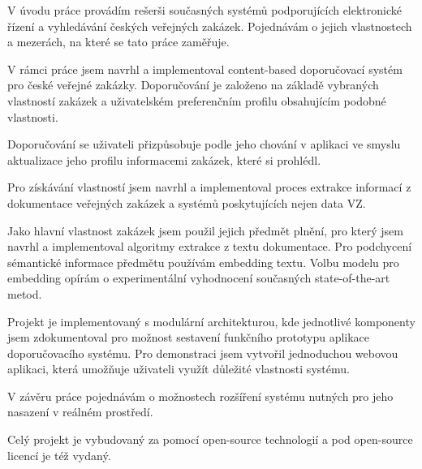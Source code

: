 \documentclass[thesis=M,czech]{FITthesis}[2019/12/23]
\begin{document}
\begin{conclusion}
	V úvodu práce provádím rešerši současných systémů podporujících elektronické řízení a vyhledávání českých veřejných zakázek. Pojednávám o jejich vlastnostech a mezerách, na které se tato práce zaměřuje.
	
	V rámci práce jsem navrhl a implementoval content-based doporučovací systém pro české veřejné zakázky. Doporučování je založeno na základě vybraných vlastností zakázek a uživatelském preferenčním profilu obsahujícím podobné vlastnosti.
	
	Doporučování se uživateli přizpůsobuje podle jeho chování v aplikaci ve smyslu aktualizace jeho profilu informacemi zakázek, které si prohlédl.
	
	Pro získávání vlastností jsem navrhl a implementoval proces extrakce informací z dokumentace veřejných zakázek a systémů poskytujících nejen data VZ.
	
	Jako hlavní vlastnost zakázek jsem použil jejich předmět plnění, pro který jsem navrhl a implementoval algoritmy extrakce z textu dokumentace. Pro podchycení sémantické informace předmětu používám embedding textu. Volbu modelu pro embedding opírám o experimentální vyhodnocení současných state-of-the-art metod.
	
	Projekt je implementovaný s modulární architekturou, kde jednotlivé komponenty jsem zdokumentoval pro možnost sestavení funkčního prototypu aplikace doporučovacího systému. Pro demonstraci jsem vytvořil jednoduchou webovou aplikaci, která umožňuje uživateli využít důležité vlastnosti systému.
	
	V závěru práce pojednávám o možnostech rozšíření systému nutných pro jeho nasazení v reálném prostředí.
	
	Celý projekt je vybudovaný za pomocí open-source technologií a pod open-source licencí je též vydaný.
\end{conclusion}




\appendix
\end{document}
